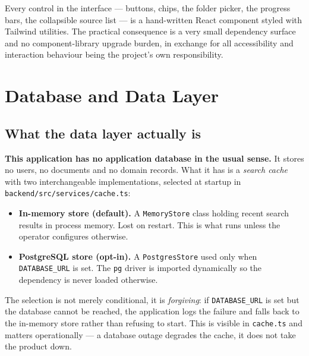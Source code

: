 \documentclass[11pt,a4paper]{report}
\newcommand{\code}[1]{\texttt{\small #1}}
\DeclareRobustCommand{\file}[1]{{\small\nolinkurl{#1}}}
\begin{document}
Every control in the interface --- buttons, chips, the folder picker, the progress
bars, the collapsible source list --- is a hand-written React component styled
with Tailwind utilities. The practical consequence is a very small dependency
surface and no component-library upgrade burden, in exchange for all accessibility
and interaction behaviour being the project's own responsibility.

\chapter{Database and Data Layer}
\label{sec:data}

\section{What the data layer actually is}

\textbf{This application has no application database in the usual sense.} It
stores no users, no documents and no domain records. What it has is a
\emph{search cache} with two interchangeable implementations, selected at
startup in \file{backend/src/services/cache.ts}:

\begin{itemize}
\item \textbf{In-memory store (default).} A \code{MemoryStore} class holding
recent search results in process memory. Lost on restart. This is what runs
unless the operator configures otherwise.
\item \textbf{PostgreSQL store (opt-in).} A \code{PostgresStore} used only when
\code{DATABASE\_URL} is set. The \code{pg} driver is imported dynamically so the
dependency is never loaded otherwise.
\end{itemize}

The selection is not merely conditional, it is \emph{forgiving}: if
\code{DATABASE\_URL} is set but the database cannot be reached, the application
logs the failure and falls back to the in-memory store rather than refusing to
start. This is visible in \file{cache.ts} and matters operationally --- a
database outage degrades the cache, it does not take the product down.
\end{document}

